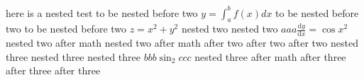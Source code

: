 \documentclass{article}
\newenvironment{one}[2][]{}{}
\newenvironment{two}{}{}
\newenvironment{three}{}{}
\begin{document}
here is a nested test
\begin{one}[cmh heading here]{something}
    to be nested before two $y=\int_a^b f(x) dx$ 
	to be nested before two
	to be nested before two $z=x^2+y^2$
	\begin{two}
		nested two
        nested two $aaa \frac{\mathrm{d}y}{\mathrm{d}x}=\cos x^2$
		nested two after math
		nested two after math
	\end{two}
    after two
    after two
    after two
	\begin{three}
		nested three
		nested three
        nested three $bbb \sin_2 ccc$
		nested three after math
	\end{three}
    after three
    after three
    after three
\end{one}
\end{document}
